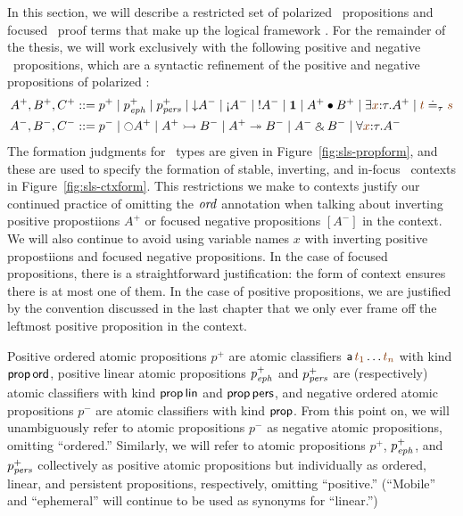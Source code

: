 In this section, we will describe a restricted set of polarized
\ollll~propositions and focused \ollll~proof terms that make up the
logical framework \sls. For the remainder of the thesis, we will work
exclusively with the following positive and negative
\sls~propositions, which are a syntactic refinement of the positive
and negative propositions of polarized \ollll:
\begin{align*}
A^+, B^+, C^+ & ::= p^+ \mid p^+_\meph \mid p^+_\mpers \mid {\downarrow}A^-
  \mid {\gnab}A^- \mid {!}A^- \mid \one \mid A^+ \fuse B^+
  \mid \exists \lf{x}{:}\tau.A^+ \mid \lf{t} \doteq_\tau \lf{s}
\\
A^-, B^-, C^- & ::= p^- \mid {\ocircle}A^+ \mid A^+ \lefti B^- 
  \mid A^+ \righti B^- \mid A^- \with B^-
  \mid \forall \lf{x}{:}\tau.A^-
\end{align*}
The formation judgments for \sls~types are given in
Figure~\ref{fig:sls-propform}, and these are used to specify the
formation of stable, inverting, and in-focus \sls~contexts in
Figure~\ref{fig:sls-ctxform}. This restrictions we make to contexts
justify our continued practice of omitting the ${\it ord}$ annotation
when talking about inverting positive propostiions $A^+$ or focused
negative propositions $[A^-]$ in the context. We will also continue to
avoid using variable names $x$ with inverting positive propostiions
and focused negative propositions. In the case of focused
propositions, there is a straightforward justification: the form of
context ensures there is at most one of them. In the case of positive
propositions, we are justified by the convention discussed in the last
chapter that we only ever frame off the leftmost positive proposition
in the context.

Positive ordered atomic propositions
$p^+$ are atomic classifiers ${\sf a}\,\lf{t_1}\ldots\lf{t_n}$ with
kind ${\sf prop}\,{\sf ord}$, positive linear atomic propositions
$p^+_{\it eph}$ and $p^+_{\it pers}$ are (respectively) atomic classifiers
with kind ${\sf prop}\,{\sf lin}$ and ${\sf prop}\,{\sf pers}$, and
negative ordered atomic propositions $p^-$ are atomic classifiers
with kind ${\sf prop}$.  From this point on,
we will unambiguously refer to atomic propositions $p^-$ as negative
atomic propositions, omitting ``ordered.'' Similarly, we will refer to
atomic propositions $p^+$, $p^+_{\it eph}$, and $p^+_{\it pers}$ collectively
as positive atomic propositions but individually as ordered, linear,
and persistent propositions, respectively, omitting ``positive.''
(``Mobile'' and ``ephemeral'' will continue to be used as synonyms for
``linear.'')

